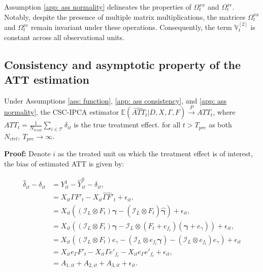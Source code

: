 \documentclass[12pt]{article}
\begin{document}
Assumption \ref{app: ass normality} delineates the properties of $\Omega_t^{xx}$ and $\Omega_t^{x\epsilon}$. Notably, despite the presence of multiple matrix multiplications, the matrices $\Omega_t^{xx}$ and $\Omega_t^{x\epsilon}$ remain invariant under these operations. Consequently, the term $\mathbb{V}_t^{[2]}$ is constant across all observational units.

\subsection{Consistency and asymptotic property of the ATT estimation}
\begin{theorem}
\label{thm: bias}
Under Assumptions \ref{ass: function}, \ref{app: ass consistency}, and \ref{app: ass normality}, the CSC-IPCA estimator $\mathbb{E}\left(\widehat{ATT}_{t} | D, X, \Gamma, F\right) \xrightarrow{P} ATT_{t}$, where $ATT_{t} = \frac{1}{N_{treat}}\sum_{i \in \mathcal{T}}\delta_{it}$ is the true treatment effect. for all $t > T_{pre}$ as both $N_{ctrl}, \ T_{pre} \to \infty$.
\end{theorem}

\textbf{Proof:} Denote $i$ as the treated unit on which the treatment effect is of interest, the bias of estimated ATT is given by:

\begin{equation*}
\begin{aligned}
\hat{\delta}_{it} - \delta_{it} &= Y_{it}^1 - \hat{Y}_{it}^0 - \delta_{it}, \\    
&= X_{it}\Gamma F'_t - X_{it}\hat{\Gamma}\hat{F}'_t + \epsilon_{it}, \\
&= X_{it}\left( \left(\mathcal{I}_L\otimes F_t \right) \bm{\gamma} - (\mathcal{I}_L\otimes \hat{F}_t ) \hat{\bm{\gamma}} \right) + \epsilon_{it}, \\
&= X_{it}\left( \left(\mathcal{I}_L\otimes F_t \right) \bm{\gamma} - \mathcal{I}_L\otimes (F_t + e_{f_t}) (\bm{\gamma}+ e_{\gamma}) \right) + \epsilon_{it}, \\
&= X_{it}\left( (\mathcal{I}_L \otimes F_t) e_{\gamma} - (\mathcal{I}_L \otimes e_{f_t} \bm{\gamma}) - (\mathcal{I}_L \otimes e_{f_t}) e_{\gamma} \right) + \epsilon_{it}\\
&= X_{it}e_{\Gamma} F'_t - X_{it}\Gamma e'_{f_t} - X_{it}e_{\Gamma} e'_{f_t} + \epsilon_{it}, \\
&= A_{1,it} + A_{2,it} + A_{3,it} + \epsilon_{it}.
\end{aligned}
\end{equation*}
\end{document}
